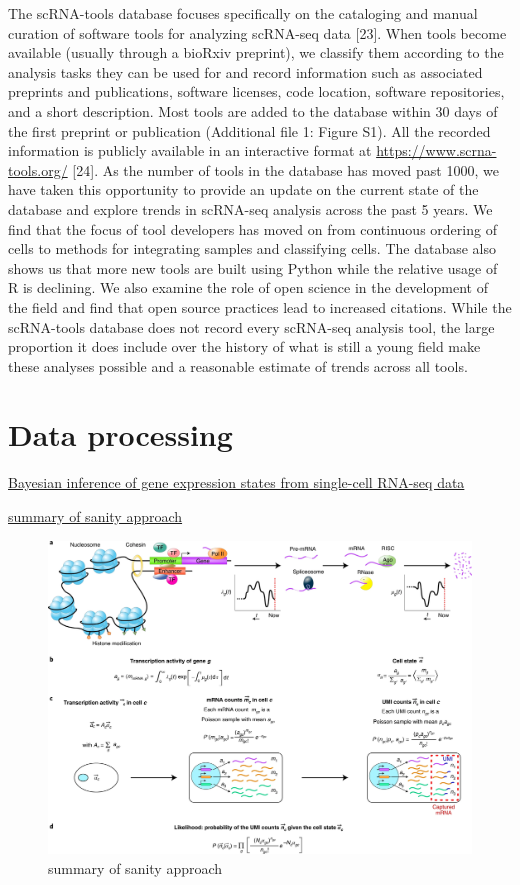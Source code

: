 \documentclass[
]{book}
\begin{document}
The scRNA-tools database focuses specifically on the cataloging and manual curation of software tools for analyzing scRNA-seq data {[}23{]}. When tools become available (usually through a bioRxiv preprint), we classify them according to the analysis tasks they can be used for and record information such as associated preprints and publications, software licenses, code location, software repositories, and a short description. Most tools are added to the database within 30 days of the first preprint or publication (Additional file 1: Figure S1). All the recorded information is publicly available in an interactive format at \url{https://www.scrna-tools.org/} {[}24{]}. As the number of tools in the database has moved past 1000, we have taken this opportunity to provide an update on the current state of the database and explore trends in scRNA-seq analysis across the past 5 years. We find that the focus of tool developers has moved on from continuous ordering of cells to methods for integrating samples and classifying cells. The database also shows us that more new tools are built using Python while the relative usage of R is declining. We also examine the role of open science in the development of the field and find that open source practices lead to increased citations. While the scRNA-tools database does not record every scRNA-seq analysis tool, the large proportion it does include over the history of what is still a young field make these analyses possible and a reasonable estimate of trends across all tools.

\hypertarget{data-processing}{%
\section{Data processing}\label{data-processing}}

\href{https://www.nature.com/articles/s41587-021-00875-x}{Bayesian inference of gene expression states from single-cell RNA-seq data}\citep{breda2021bayesian}

\href{https://www.nature.com/articles/s41587-021-00875-x/figures/1}{summary of sanity approach}

\begin{figure}
\centering
\includegraphics{./figs/singleCell/summary_Sanity.jpg}
\caption{summary of sanity approach}
\end{figure}
\end{document}
